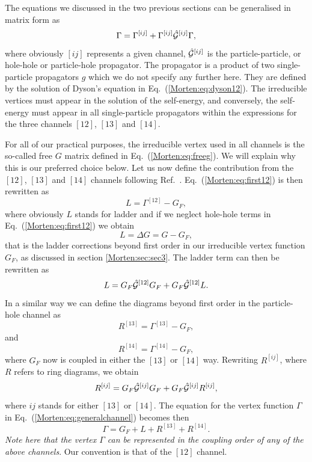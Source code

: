 The equations we discussed in the two previous sections can 
be generalised
in matrix form as
\begin{equation} 
      \Gamma= \Gamma^{[ij]}+\Gamma^{[ij]}\hat{{\cal G}}^{[ij]}\Gamma,
      \label{Morten:eq:generalchannel}
\end{equation}
where obviously $[ij]$ represents a given channel,
$\hat{{\cal G}}^{[ij]}$ is the particle-particle, or hole-hole or particle-hole
propagator. 
The propagator is a product of two single-particle propagators $g$
which we do not specify any further here. They are
defined by the solution of Dyson's equation in Eq.~(\ref{Morten:eq:dyson12}).
The irreducible vertices must appear in the solution of
the self-energy, and conversely, the self-energy must appear in all
single-particle propagators within the expressions for the three
channels $[12]$, $[13]$ and $[14]$. 

For all of our practical purposes, the irreducible vertex used in all
channels is the so-called free $G$ matrix defined in
Eq.~(\ref{Morten:eq:freeg}). We will explain why this is our
preferred choice below.  Let us now define the contribution from the
$[12]$, $[13]$ and $[14]$ channels following
Ref.~.  Eq.~(\ref{Morten:eq:first12}) is then
rewritten as
\begin{equation}
    L=\Gamma^{[12]}-G_F,
\end{equation}
where obviously $L$ stands for ladder and if we neglect hole-hole
terms in Eq.~(\ref{Morten:eq:first12}) we obtain 
\begin{equation}
    L=\Delta G =G-G_F,
\end{equation}
that is the ladder corrections beyond first order in our 
irreducible vertex function $G_F$, as discussed in section \ref{Morten:sec:sec3}.
The ladder term can then be rewritten as 
\begin{equation}
    L=G_F\hat{{\cal G}}^{[12]}G_F+G_F\hat{{\cal G}}^{[12]}L.
    \label{Morten:eq:ladder}
\end{equation}
In a similar way we can define the diagrams beyond
first order in the particle-hole channel as
\begin{equation}
    R^{[13]}=\Gamma^{[13]}-G_F,
\end{equation}
and 
\begin{equation}
    R^{[14]}=\Gamma^{[14]}-G_F,
\end{equation}
where $G_F$ now is coupled in either the $[13]$ or $[14]$ way.
Rewriting $R^{[ij]}$, where $R$ refers to ring diagrams,
we obtain
\begin{equation}
    R^{[ij]}=G_F\hat{{\cal G}}^{[ij]}G_F+G_F\hat{{\cal G}}^{[ij]}R^{[ij]},
    \label{Morten:eq:ring}
\end{equation}
where $ij$ stands for either $[13]$ or $[14]$.  The equation for the
vertex function $\Gamma$ in Eq.~(\ref{Morten:eq:generalchannel})
becomes then
\begin{equation}
    \Gamma=G_F+L+R^{[13]}+R^{[14]}.
     \label{Morten:eq:gammap}
\end{equation}
{\em Note here that the vertex $\Gamma$ can be represented in the coupling
order of any of the above channels}. Our convention is that of the 
$[12]$ channel.


